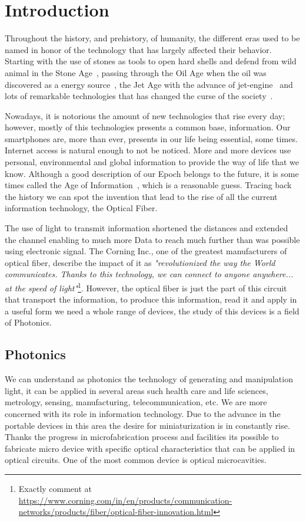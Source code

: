 \chapter{Introduction}

Throughout the history, and prehistory, of humanity, the different eras used to be named in honor of the technology that has largely affected their behavior. Starting with the use of stones as tools to open hard shells and defend from wild animal in the Stone Age~\cite{livescience_2011}, passing through the Oil Age when the oil was discovered as a energy source~\cite{Maugeri_2007}, the Jet Age with the advance of jet-engine~\cite{brit_fly} and lots of remarkable technologies that has changed the curse of the society~\cite{brit_tec}.

Nowadays, it is notorious the amount of new technologies that rise every day; however, mostly of this technologies presents a common base, information. Our smartphones are, more than ever, presents in our life being essential, some times. Internet access is natural enough to not be noticed. More and more devices use personal, environmental and global information to provide the way of life that we know. Although a good description of our Epoch belongs to the future, it is some times called the Age of Information~\cite{TechTarget, NYT_2012, Forbes}, which is a reasonable guess. Tracing back the history we can spot the invention that lead to the rise of all the current information technology, the Optical Fiber.

The use of light to transmit information shortened the distances and extended the channel enabling to much more Data to reach much further than was possible using electronic signal. The Corning Inc., one of the greatest manufacturers of optical fiber, describe the impact of it as \textit{"revolutionized the way the World communicates. Thanks to this technology, we can connect to anyone anywhere... at the speed of light"}\footnote{Exactly comment at \url{https://www.corning.com/in/en/products/communication-networks/products/fiber/optical-fiber-innovation.html}}. However, the optical fiber is just the part of this circuit that transport the information, to produce this information, read it and apply in a useful form we need a whole range of devices, the study of this devices is a field of Photonics.

\section{Photonics}
We can understand as photonics the technology of generating and manipulation light, it can be applied in several areas such health care and life sciences, metrology, sensing, manufacturing, telecommunication, etc. We are more concerned with its role in information technology. Due to the advance in the portable devices in this area the desire for miniaturization is in constantly rise. Thanks the progress in microfabrication process and facilities its possible to fabricate micro device with specific optical characteristics that can be applied in optical circuits. One of the most common device is optical microcavities.    

